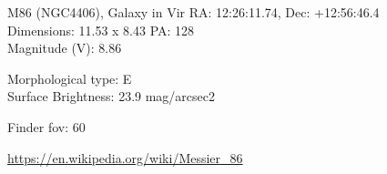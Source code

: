 \begin{block}{M86 (NGC4406), Galaxy in Vir}
    RA: 12:26:11.74, Dec: +12:56:46.4 \\ 
    Dimensions: 11.53 x 8.43 PA: 128 \\ 
    Magnitude (V): 8.86

    Morphological type: E \\ 
    Surface Brightness: 23.9 mag/arcsec2 


    Finder fov: 60 

    \url{https://en.wikipedia.org/wiki/Messier_86} 
\end{block}